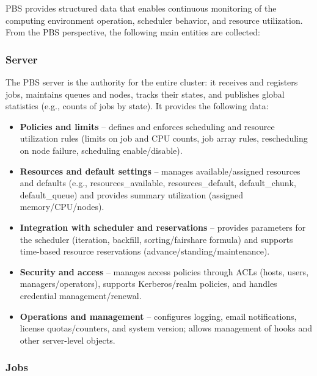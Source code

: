 \documentclass[
  digital,     %
  oneside,     %
  nosansbold,  %
  nocolorbold, %
  lof,         %
  lot,         %
]{fithesis4}
\begin{document}
PBS provides structured data that enables continuous monitoring of the computing environment operation, scheduler behavior, and resource utilization. From the PBS perspective, the following main entities are collected:


\subsubsection{Server}
\label{subsubsec:server-pbs-server}

The PBS server is the authority for the entire cluster: it receives and registers jobs, maintains queues and nodes, tracks their states, and publishes global statistics (e.g., counts of jobs by state). It provides the following data:

\begin{itemize}
  \item \textbf{Policies and limits} -- defines and enforces scheduling and resource utilization rules (limits on job and CPU counts, job array rules, rescheduling on node failure, scheduling enable/disable).
  
  \item \textbf{Resources and default settings} -- manages available/assigned resources and defaults (e.g., resources\_available, resources\_default, default\_chunk, default\_queue) and provides summary utilization (assigned memory/CPU/nodes).
  
  \item \textbf{Integration with scheduler and reservations} -- provides parameters for the scheduler (iteration, backfill, sorting/fairshare formula) and supports time-based resource reservations (advance/standing/maintenance).
  
  \item \textbf{Security and access} -- manages access policies through ACLs (hosts, users, managers/operators), supports Kerberos/realm policies, and handles credential management/renewal.
  
  \item \textbf{Operations and management} -- configures logging, email notifications, license quotas/counters, and system version; allows management of hooks and other server-level objects.
\end{itemize}

\subsubsection{Jobs}
\label{subsubsec:jobs}
\end{document}
